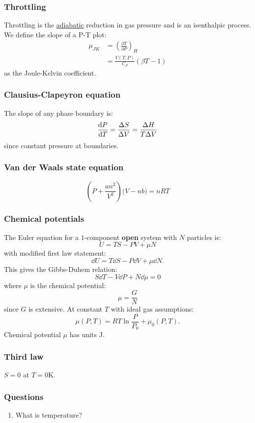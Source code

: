 \documentclass{article}
\begin{document}
\begin{multicols*}{3}
\subsubsection*{Throttling}
Throttling is the \underline{adiabatic} 
reduction in gas pressure
and is an isenthalpic process.
We define
the slope of a P-T plot:
\begin{align*}
    \mu_{JK}&=\left(
    \frac{\partial T}{\partial P}\right)_H \\
    &=\frac{V(T,P)}{C_P}(\beta T-1)
\end{align*}
as the
Joule-Kelvin coefficient.

\subsubsection*{Clausius-Clapeyron equation}
The slope of any phase boundary is:
$$\dv{P}{T}=\frac{\Delta S}{\Delta V}
=\frac{\Delta H}{T\Delta V}$$
since constant pressure at boundaries.

\subsubsection*{Van der Waals state equation}
$$\left(P+\frac{an^2}{V^2}\right)
\bigl(V-nb\bigr)=nRT$$

\subsubsection*{Chemical potentials}
The Euler equation for a $1$-component
\textbf{open} system with
$N$ particles is:
$$U=TS-PV+\mu N$$
with modified first law statement: 
$$\dd U
=T\dd S-P\dd V+\mu\dd N.$$
This gives the Gibbs-Duhem relation:
$$S\dd T-V\dd P+N\dd\mu=0$$
where $\mu$ is the chemical potential:
$$\mu=\frac{G}{N}$$
since $G$ is extensive. At constant $T$
with ideal gas assumptions:
$$\mu(P,T)=RT\ln\frac{P}{P_0}+\mu_0(P,T).$$
Chemical potential $\mu$ has units J.

\subsubsection*{Third law}
$S=0$ at $T=0$K.

\subsubsection*{Questions}
\begin{enumerate}
    \item What is temperature?
\end{enumerate}

\end{multicols*}
\end{document}
